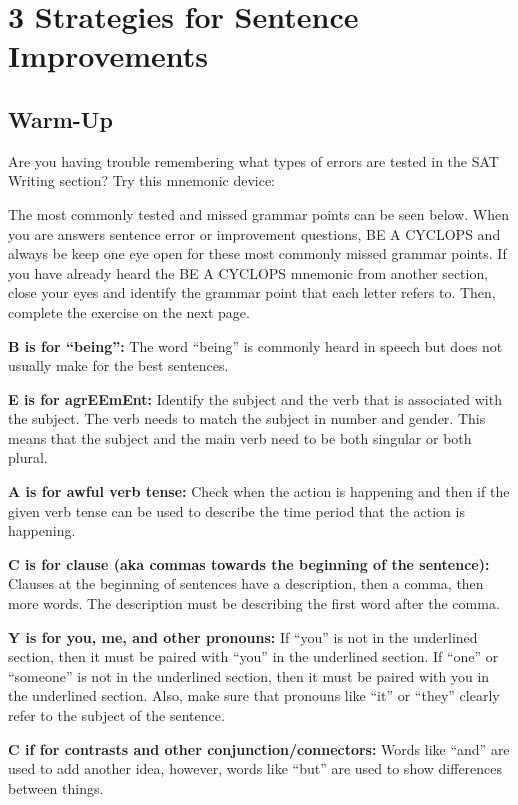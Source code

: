 \documentclass[12pt]{book}
\begin{document}
\chapter{3 Strategies for Sentence Improvements}
\section{Warm-Up}

Are you having trouble remembering what types of errors are tested in the SAT Writing section?
Try this mnemonic device:

The most commonly tested and missed grammar points can be seen below. When you are answers sentence error or improvement questions, BE A CYCLOPS and always be keep one eye open for these most commonly missed grammar points. If you have already heard the BE A CYCLOPS mnemonic from another section, close your eyes and identify the grammar point that each letter refers to. Then, complete the exercise on the next page. 

\bigskip
\textbf{B is for “being”:} The word “being” is commonly heard in speech but does not usually make for the best sentences.

\bigskip
\textbf{E is for agrEEmEnt:} Identify the subject and the verb that is associated with the subject. The verb needs to match the subject in number and gender. This means that the subject and the main verb need to be both singular or both plural. 

\bigskip

\bigskip
\textbf{A is for awful verb tense:} Check when the action is happening and then if the given verb tense can be used to describe the time period that the action is happening. 

\bigskip

\bigskip
\textbf{C is for clause (aka commas towards the beginning of the sentence):} Clauses at the beginning of sentences have a description, then a comma, then more words. The description must be describing the first word after the comma. 

\bigskip
\textbf{Y is for you, me, and other pronouns:} If “you” is not in the underlined section, then it must be paired with “you” in the underlined section. If “one” or “someone” is not in the underlined section, then it must be paired with you in the underlined section. Also, make sure that pronouns like “it” or “they” clearly refer to the subject of the sentence. 

\bigskip
\textbf{C if for contrasts and other conjunction/connectors:} Words like “and” are used to add another idea, however, words like “but” are used to show differences between things. 
\end{document}
